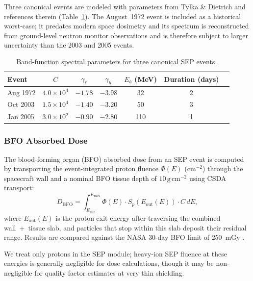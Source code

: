 Three canonical events are modeled with parameters from Tylka \& Dietrich \cite{tylka2006}
and references therein (Table~\ref{tab:sep_events}).
The August~1972 event is included as a historical worst-case;
it predates modern space dosimetry and its spectrum is reconstructed
from ground-level neutron monitor observations and is therefore subject
to larger uncertainty than the 2003 and 2005 events.

\begin{table}[H]
  \centering
  \caption{Band-function spectral parameters for three canonical SEP events.}
  \label{tab:sep_events}
  \begin{tabular}{lcccccc}
    \toprule
    Event & $C$ & $\gamma_\ell$ & $\gamma_h$ & $E_b$ (MeV) & Duration (days) \\
    \midrule
    Aug 1972 & $4.0\times10^4$ & $-1.78$ & $-3.98$ & 32  & 2 \\
    Oct 2003 & $1.5\times10^4$ & $-1.40$ & $-3.20$ & 50  & 3 \\
    Jan 2005 & $3.0\times10^2$ & $-0.90$ & $-2.80$ & 110 & 1 \\
    \bottomrule
  \end{tabular}
\end{table}

\subsubsection{BFO Absorbed Dose}
\label{sec:bfodose}

The blood-forming organ (BFO) absorbed dose from an SEP event is computed
by transporting the event-integrated proton fluence $\Phi(E)$ (cm$^{-2}$)
through the spacecraft wall and a nominal BFO tissue depth
of $10\,\mathrm{g\,cm^{-2}}$ using CSDA transport:
\begin{equation}
  D_\mathrm{BFO} = \int_{E_\mathrm{min}}^{E_\mathrm{max}}
    \Phi(E) \cdot S_p(E_\mathrm{out}(E)) \cdot C \, dE,
  \label{eq:sep_dose}
\end{equation}
where $E_\mathrm{out}(E)$ is the proton exit energy after traversing
the combined wall~+~tissue slab, and particles that stop within this
slab deposit their residual range.
Results are compared against the NASA 30-day BFO limit of $250$~mGy
\citep{cucinotta2010}.

We treat only protons in the SEP module; heavy-ion SEP fluence at
these energies is generally negligible for dose calculations,
though it may be non-negligible for quality factor estimates at
very thin shielding.

